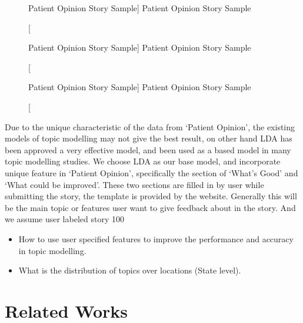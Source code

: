 \documentclass[11pt,twoside]{report}
\begin{document}
\begin{figure}[tp]
    \begin{center}
    \caption
    [Patient Opinion Story Sample]
    {
    Patient Opinion Story Sample
    \label{fig-story_sample}
    }
    \end{center}
\end{figure}

\begin{figure}[h]
    \begin{center}
    \caption
    [Patient Opinion Story Sample]
    {
    Patient Opinion Story Sample
    \label{fig-story_sample}
    }
    \end{center}
\end{figure}

\begin{figure}[h]
    \begin{center}
    \caption
    [Patient Opinion Story Sample]
    {
    Patient Opinion Story Sample
    \label{fig-story_sample}
    }
    \end{center}
\end{figure}

Due to the unique characteristic of the data from ‘Patient Opinion’, the existing models of topic modelling may not give the best result, on other hand LDA has been approved a very effective  model, and been used as a based model in many topic modelling studies. We choose LDA as our base model, and incorporate unique feature in ‘Patient Opinion’, specifically the section of ‘What’s Good’ and ‘What could be improved’. These two sections are filled in by user while submitting the story, the template is provided by the website. Generally this will be the main topic or features user want to give feedback about in the story. And we assume user labeled story 100%
\begin{itemize}
\item How to use user specified features to improve the performance and accuracy in topic modelling.
\item What is the distribution of topics over locations (State level).
\end{itemize}

\chapter{Related Works}
\end{document}
